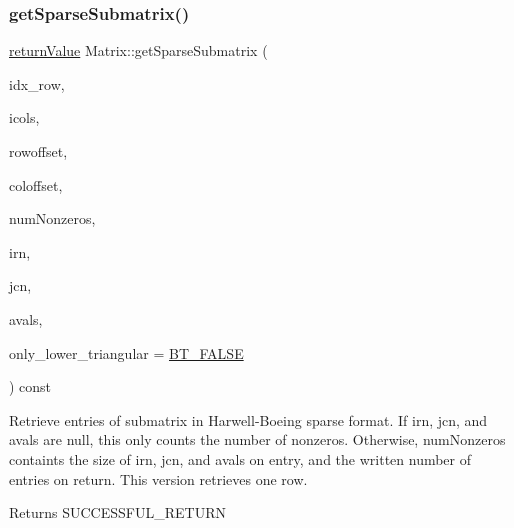 \subsubsection{\texorpdfstring{get\+Sparse\+Submatrix()}{getSparseSubmatrix()}\hspace{0.1cm}{\footnotesize\ttfamily [3/4]}}
{\footnotesize\ttfamily \hyperlink{_message_handling_8hpp_a81d556f613bfbabd0b1f9488c0fa865e}{return\+Value} Matrix\+::get\+Sparse\+Submatrix (\begin{DoxyParamCaption}\item[{\hyperlink{_types_8hpp_ab6fd6105e64ed14a0c9281326f05e623}{int\+\_\+t}}]{idx\+\_\+row,  }\item[{const \hyperlink{class_indexlist}{Indexlist} $\ast$const}]{icols,  }\item[{\hyperlink{_types_8hpp_ab6fd6105e64ed14a0c9281326f05e623}{int\+\_\+t}}]{rowoffset,  }\item[{\hyperlink{_types_8hpp_ab6fd6105e64ed14a0c9281326f05e623}{int\+\_\+t}}]{coloffset,  }\item[{\hyperlink{_types_8hpp_ab6fd6105e64ed14a0c9281326f05e623}{int\+\_\+t} \&}]{num\+Nonzeros,  }\item[{\hyperlink{_types_8hpp_ab6fd6105e64ed14a0c9281326f05e623}{int\+\_\+t} $\ast$}]{irn,  }\item[{\hyperlink{_types_8hpp_ab6fd6105e64ed14a0c9281326f05e623}{int\+\_\+t} $\ast$}]{jcn,  }\item[{\hyperlink{qp_o_a_s_e_s__wrapper_8h_a0d00e2b3dfadee81331bbb39068570c4}{real\+\_\+t} $\ast$}]{avals,  }\item[{\hyperlink{_types_8hpp_a20f82124c82b6f5686a7fce454ef9089}{Boolean\+Type}}]{only\+\_\+lower\+\_\+triangular = {\ttfamily \hyperlink{_types_8hpp_a20f82124c82b6f5686a7fce454ef9089a85b8a20e72a8bea5dd10a6007fe3071e}{B\+T\+\_\+\+F\+A\+L\+SE}} }\end{DoxyParamCaption}) const\hspace{0.3cm}{\ttfamily [virtual]}}

Retrieve entries of submatrix in Harwell-\/\+Boeing sparse format. If irn, jcn, and avals are null, this only counts the number of nonzeros. Otherwise, num\+Nonzeros containts the size of irn, jcn, and avals on entry, and the written number of entries on return. This version retrieves one row. \begin{DoxyReturn}{Returns}
S\+U\+C\+C\+E\+S\+S\+F\+U\+L\+\_\+\+R\+E\+T\+U\+RN 
\end{DoxyReturn}

